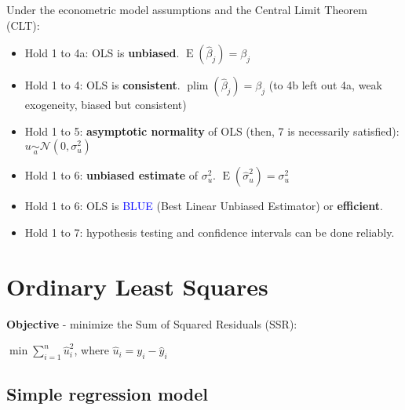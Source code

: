\documentclass[10pt, a4paper, landscape]{article}
\DeclareMathOperator{\E}{E}
\begin{document}
\begin{multicols}{3}
Under the econometric model assumptions and the Central Limit Theorem (CLT):

\begin{itemize}[leftmargin=*]
	\item Hold 1 to 4a: OLS is \textbf{unbiased}. \( \E(\hat{\beta}_{j}) = \beta_{j} \)
	\item Hold 1 to 4: OLS is \textbf{consistent}. \( \operatorname{plim}(\hat{\beta}_{j}) = \beta_{j} \) (to 4b left out 4a, weak exogeneity, biased but consistent)
	\item Hold 1 to 5: \textbf{asymptotic normality} of OLS (then, 7 is necessarily satisfied): \( u \underset{a}{\sim} \mathcal{N} (0, \sigma_{u}^{2}) \)
	\item Hold 1 to 6: \textbf{unbiased estimate} of \( \sigma_{u}^{2} \). \( \E(\hat{\sigma}_{u}^{2}) = \sigma_{u}^{2} \)
	\item Hold 1 to 6: OLS is \textcolor{blue}{BLUE} (Best Linear Unbiased Estimator) or \textbf{efficient}.
	\item Hold 1 to 7: hypothesis testing and confidence intervals can be done reliably.
\end{itemize}

\columnbreak

\section*{Ordinary Least Squares}

\textbf{Objective} - minimize the Sum of Squared Residuals (SSR):

\begin{center}
	\( \min \sum_{i = 1}^{n} \hat{u}_{i}^{2} \), where \( \hat{u}_{i} = y_{i} - \hat{y}_{i} \)
\end{center}

\subsection*{Simple regression model}

\setlength{\multicolsep}{2pt}
\setlength{\columnsep}{-40pt}
\begin{multicols}{2}



\end{multicols}
\end{multicols}
\end{document}
